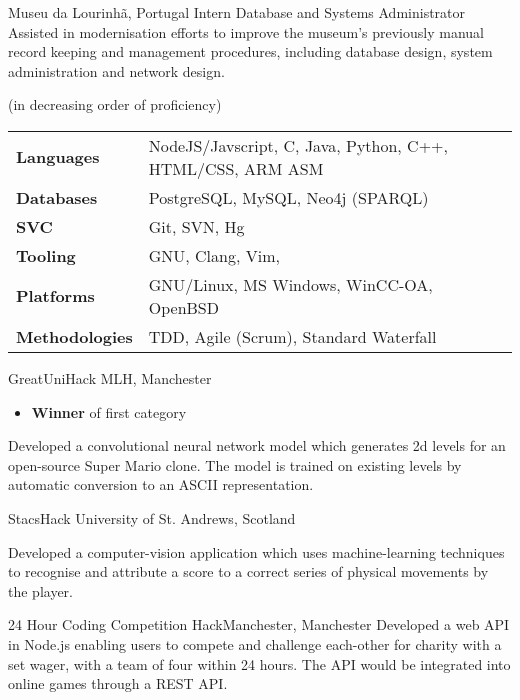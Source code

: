 \documentclass[12pt,a4paper]{article}
\begin{document}
       {Museu da Lourinh\~a, Portugal}
       {Intern Database and Systems Administrator}
{%
  Assisted in modernisation efforts to improve the museum's previously manual
  record keeping and management procedures, including database design, system
  administration and network design.
}

\pagebreak
%
%
\hfill (in decreasing order of proficiency)\\
\vspace{0.7cm}

\begin{tabular}{>{\bfseries}l l}
  Languages   & NodeJS/Javscript, C, Java, Python, C++, HTML/CSS, ARM ASM\\
  Databases   & PostgreSQL, MySQL, Neo4j (SPARQL)\\
  SVC         & Git, SVN, Hg\\
  Tooling     & GNU, Clang, Vim, \\
  Platforms   & GNU/Linux, MS Windows, WinCC-OA, OpenBSD\\
  Methodologies  & TDD, Agile (Scrum), Standard Waterfall
\end{tabular}


        {GreatUniHack}
        {MLH, Manchester}
{%
  \begin{itemize}
    \item {\bfseries Winner} of first category
  \end{itemize}

  Developed a convolutional neural network model which generates 2d levels for
  an open-source Super Mario clone. The model is trained on existing levels by
  automatic conversion to an ASCII representation.
}

       {StacsHack}
       {University of St. Andrews, Scotland}
{%

  Developed a computer-vision application which uses machine-learning techniques
  to recognise and attribute a score to a correct series of physical movements
  by the player.

}

       {24 Hour Coding Competition}
       {HackManchester, Manchester}
{%
  Developed a web API in Node.js enabling users to compete and challenge
  each-other for charity with a set wager, with a team of four within 24 hours.
  The API would be integrated into online games through a REST API\@.
}
\end{document}
